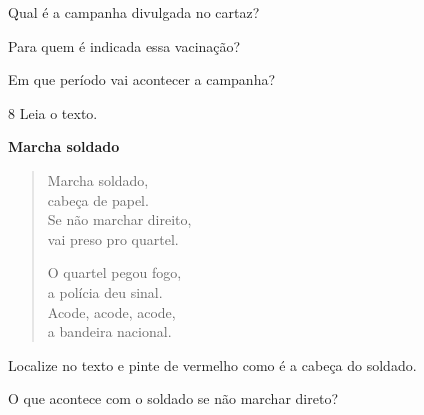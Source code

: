 
\begin{escolha}
\item Qual é a campanha divulgada no cartaz?


\item Para quem é indicada essa vacinação?


\item Em que período vai acontecer a campanha?
	
\end{escolha}

\num{8} Leia o texto.


\textbf{Marcha soldado}

\begin{verse}
Marcha soldado,\\
cabeça de papel.\\
Se não marchar direito,\\
vai preso pro quartel.

O quartel pegou fogo,\\
a polícia deu sinal.\\
Acode, acode, acode,\\
a bandeira nacional.
\end{verse}


\begin{escolha}
\item Localize no texto e pinte de vermelho como é a cabeça do soldado.

\item O que acontece com o soldado se não marchar direto?


\end{escolha}


